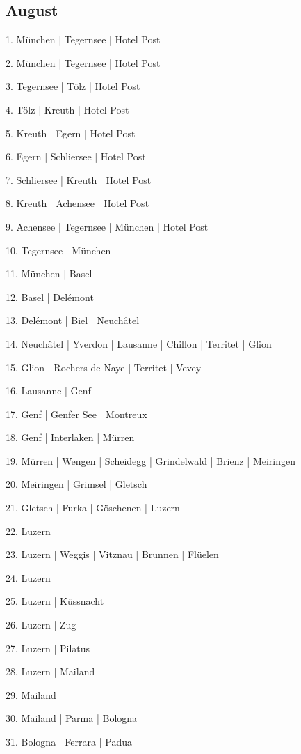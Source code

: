 \documentclass[twoside=false,titlepage=false,open=any, parskip=never, fontsize=10pt, headings=small, chapterprefix=false, appendixprefix=false, DIV=15]{scrbook}
\begin{document}
\begin{multicols}{3}
            \section*{August}
            1. München | Tegernsee | Hotel Post\par
            2. München | Tegernsee | Hotel Post\par
            3. Tegernsee | Tölz | Hotel Post\par
            4. Tölz | Kreuth | Hotel Post\par
            5. Kreuth | Egern | Hotel Post\par
            6. Egern | Schliersee | Hotel Post\par
            7. Schliersee | Kreuth | Hotel Post\par
            8. Kreuth | Achensee | Hotel Post\par
            9. Achensee | Tegernsee | München | Hotel Post\par
            10. Tegernsee | München\par
            11. München | Basel\par
            12. Basel | Delémont\par
            13. Delémont | Biel | Neuchâtel\par
            14. Neuchâtel | Yverdon | Lausanne | Chillon | Territet | Glion\par
            15. Glion | Rochers de Naye | Territet | Vevey\par
            16. Lausanne | Genf\par
            17. Genf | Genfer See | Montreux\par
            18. Genf | Interlaken | Mürren\par
            19. Mürren | Wengen | Scheidegg | Grindelwald | Brienz | Meiringen\par
            20. Meiringen | Grimsel | Gletsch\par
            21. Gletsch | Furka | Göschenen | Luzern\par
            22. Luzern\par
            23. Luzern | Weggis | Vitznau | Brunnen | Flüelen\par
            24. Luzern\par
            25. Luzern | Küssnacht\par
            26. Luzern | Zug\par
            27. Luzern | Pilatus\par
            28. Luzern | Mailand\par
            29. Mailand\par
            30. Mailand | Parma | Bologna\par
            31. Bologna | Ferrara | Padua\par

\end{multicols}
\end{document}
